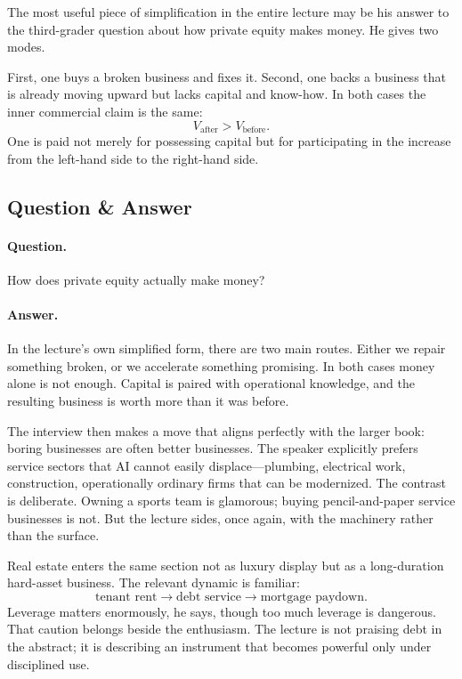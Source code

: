 The most useful piece of simplification in the entire lecture may be his answer to the third-grader question about how private equity makes money. He gives two modes.

First, one buys a broken business and fixes it. Second, one backs a business that is already moving upward but lacks capital and know-how. In both cases the inner commercial claim is the same:
\begin{equation}
V_{\text{after}} > V_{\text{before}}.
\end{equation}
One is paid not merely for possessing capital but for participating in the increase from the left-hand side to the right-hand side.

\subsection{Question \& Answer}

\paragraph{Question.} How does private equity actually make money?

\paragraph{Answer.} In the lecture's own simplified form, there are two main routes. Either we repair something broken, or we accelerate something promising. In both cases money alone is not enough. Capital is paired with operational knowledge, and the resulting business is worth more than it was before.

The interview then makes a move that aligns perfectly with the larger book: boring businesses are often better businesses. The speaker explicitly prefers service sectors that AI cannot easily displace---plumbing, electrical work, construction, operationally ordinary firms that can be modernized. The contrast is deliberate. Owning a sports team is glamorous; buying pencil-and-paper service businesses is not. But the lecture sides, once again, with the machinery rather than the surface.

Real estate enters the same section not as luxury display but as a long-duration hard-asset business. The relevant dynamic is familiar:
\begin{equation}
\text{tenant rent} \to \text{debt service} \to \text{mortgage paydown}.
\end{equation}
Leverage matters enormously, he says, though too much leverage is dangerous. That caution belongs beside the enthusiasm. The lecture is not praising debt in the abstract; it is describing an instrument that becomes powerful only under disciplined use.

